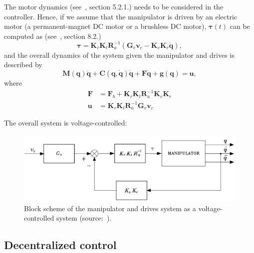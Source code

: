 \documentclass[10pt, aspectratio=169]{beamer}
\theoremstyle{remark}
\theoremstyle{definition}
\begin{document}
\begin{frame}[allowframebreaks]
    The motor dynamics (see~\cite{sciavicco2010robotics}, section 5.2.1.) needs to be considered in the controller. Hence, if we assume that the manipulator is driven by an electric motor (a permanent-magnet DC motor or a brushless DC motor), $\boldsymbol{\tau}(t)$ can be computed as (see~\cite{sciavicco2010robotics}, section 8.2.)
    $$
    \boldsymbol{\tau} = \mathbf{K}_r \mathbf{K}_t \mathbf{R}_a^{-1} (\mathbf{G}_v \mathbf{v}_c - \mathbf{K}_v \mathbf{K}_r \dot{\mathbf{q}}),
    $$
    and the overall dynamics of the system given the manipulator and drives is described by
    $$
    \mathbf{M}(\mathbf{q}) \ddot{\mathbf{q}} + \mathbf{C}(\mathbf{q}, \dot{\mathbf{q}}) \dot{\mathbf{q}} +  \mathbf{F} \dot{\mathbf{q}} + \mathbf{g}(\mathbf{q}) = \boldsymbol{u},
    $$
    where
    \begin{equation*}
    \begin{split}
        \mathbf{F} &= \mathbf{F}_b + \mathbf{K}_r\mathbf{K}_t\mathbf{R}_a^{-1}\mathbf{K}_v\mathbf{K}_r\\
        \mathbf{u} &= \mathbf{K}_r\mathbf{K}_t\mathbf{R}_a^{-1}\mathbf{G}_v\mathbf{v}_c
    \end{split}
    \end{equation*}

    \framebreak

    The overall system is \textcolor{uma_blue_light}{voltage-controlled}:

    \begin{figure}
        \centering
        \includegraphics[width=0.75\linewidth]{images/voltage_controlled_1.png}
        \caption{Block scheme of the manipulator and drives system as a voltage-controlled system (source:~\cite{sciavicco2010robotics}).}
        \label{fig:voltage_controlled_1}
    \end{figure}

   
    
\end{frame}


\subsection{Decentralized control}
\end{document}
